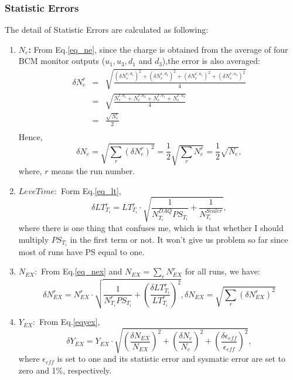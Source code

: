 \documentclass[a4paper,10.5pt]{report}
\begin{document}
\subsubsection{Statistic Errors}
The detail of Statistic Errors are calculated as following:
\begin{enumerate}

\item \textbf{$N_{e}$:} From Eq.\ref{eq_ne}, since the charge is obtained from the average of four BCM monitor outputs ($u_{1},u_{3},d_{1}$ and $d_{3}$),the error is also averaged:
\begin{eqnarray*}
  \delta N_{e}^{r} &=& \sqrt{\frac{(\delta N_{e}^{r,d_{1}})^{2}+(\delta N_{e}^{r,d_{3}})^{2}+(\delta N_{e}^{r,u_{1}})^{2}+(\delta N_{e}^{r,u_{3}})^{2}}{4}}\\
                  &=& \sqrt{\frac{N_{e}^{r,d_{1}}+N_{e}^{r,d_{3}}+N_{e}^{r,u_{1}}+N_{e}^{r,u_{3}}}{4}}\\
                  &=& \frac{\sqrt{N_{e}^{r}}}{2} \\
\end{eqnarray*}
Hence,
\begin{equation}
  \delta N_{e} = \sqrt{\sum_{r}(\delta N_{e}^{r})^{2}}=\frac{1}{2}\sqrt{\sum_{r}N_{e}^{r}}=\frac{1}{2}\sqrt{N_{e}},
\end{equation}
where, $r$ means the run number.

\item \textbf{$Leve Time:$} Form Eq.\ref{eq_lt},
\begin{equation}
  \delta LT^{r}_{T_{i}} = LT^{r}_{T_{i}} \cdot \sqrt{\frac{1}{N_{T_{i}}^{DAQ} PS_{T_{i}}}+\frac{1}{N_{T_{i}}^{Scaler}}},
\end{equation}
where there is one thing that confuses me, which is that whether I should multiply $PS_{T_{i}}$ in the first term or not. It won't give us problem so far since most of runs have PS equal to one.

\item \textbf{$N_{EX}:$} From  Eq.\ref{eq_nex} and $N_{EX}=\sum_{r}N_{EX}^{r}$ for all runs, we have:
\begin{equation}
  \delta N_{EX}^{r} = N_{EX}^{r} \cdot \sqrt{\frac{1}{N_{T_{i}}^{r} PS_{T_{i}}} + (\frac{\delta LT_{T_{i}}^{r}}{LT_{T_{i}}^{r}})^{2} }, \delta N_{EX}=\sqrt{\sum_{r}(\delta N_{EX}^{r})^{2}}
\end{equation}

\item \textbf{$Y_{EX}:$} From Eq.\ref{eqyex},
\begin{equation}
  \delta Y_{EX} =  Y_{EX} \cdot \sqrt{(\frac{\delta N_{EX}}{N_{EX}})^{2}+(\frac{\delta N_{e}}{N_{e}})^{2}+(\frac{\delta\epsilon_{eff}}{\epsilon_{eff}})^{2}},
\end{equation}
where $\epsilon_{eff}$ is set to one and its statistic error and sysmatic error are set to zero and 1\%, respectively.


\end{enumerate}
\end{document}
